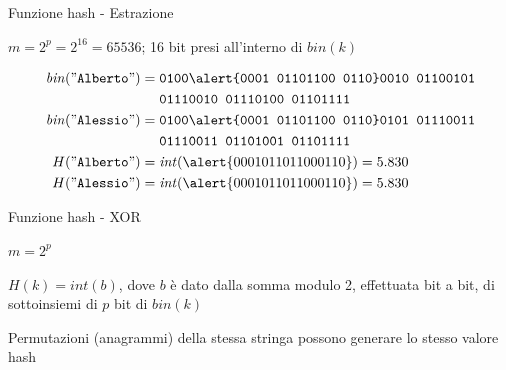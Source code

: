 \begin{frame}{Funzione hash - Estrazione}


\vspace{-6pt}
\begin{myboxtitle}[Esempio 2]
$m = 2^p = 2^{16} = 65536$; 16 bit presi all'interno di $\mathit{bin}(k)$

\begin{align*}
\mathit{bin}("\texttt{Alberto}") = {} & \texttt{0100\alert{0001  01101100  0110}0010  01100101} \\ 
&  \texttt{01110010  01110100  01101111}\\
\mathit{bin}("\texttt{Alessio}") = {} & \texttt{0100\alert{0001  01101100  0110}0101  01110011} \\ 
&  \texttt{01110011  01101001  01101111} \\
H("\texttt{Alberto}") = {} & \mathit{int}(\alert{0001011011000110}) = 5.830 \\
H("\texttt{Alessio}") = {} & \mathit{int}(\alert{0001011011000110}) = 5.830
\end{align*}
\end{myboxtitle}


\end{frame}

\begin{frame}[shrink=5]{Funzione hash - XOR}

\vspace{-6pt}
\begin{myboxtitle}[XOR]
\BIL
\item $m = 2^p$
\item $H(k) = \mathit{int}(b)$, dove $b$ è dato dalla somma modulo 2, effettuata bit a bit, di sottoinsiemi di $p$ bit di $\mathit{bin}(k)$
\EIL
\end{myboxtitle}

\BIL
\item Permutazioni (anagrammi) della stessa stringa possono generare lo stesso valore hash
\EIL


\end{frame}


